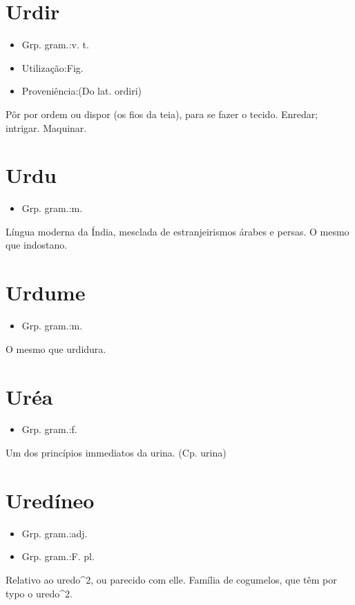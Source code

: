 \documentclass{article}
\begin{document}
\section{Urdir}
\begin{itemize}
\item {Grp. gram.:v. t.}
\end{itemize}
\begin{itemize}
\item {Utilização:Fig.}
\end{itemize}
\begin{itemize}
\item {Proveniência:(Do lat. \textunderscore ordiri\textunderscore )}
\end{itemize}
Pôr por ordem ou dispor (os fios da teia), para se fazer o tecido.
Enredar; intrigar.
Maquinar.
\section{Urdu}
\begin{itemize}
\item {Grp. gram.:m.}
\end{itemize}
Língua moderna da Índia, mesclada de estranjeirismos árabes e persas.
O mesmo que \textunderscore indostano\textunderscore .
\section{Urdume}
\begin{itemize}
\item {Grp. gram.:m.}
\end{itemize}
O mesmo que \textunderscore urdidura\textunderscore .
\section{Uréa}
\begin{itemize}
\item {Grp. gram.:f.}
\end{itemize}
Um dos princípios immediatos da urina.
(Cp. \textunderscore urina\textunderscore )
\section{Uredíneo}
\begin{itemize}
\item {Grp. gram.:adj.}
\end{itemize}
\begin{itemize}
\item {Grp. gram.:F. pl.}
\end{itemize}
Relativo ao uredo^2, ou parecido com elle.
Família de cogumelos, que têm por typo o uredo^2.
\end{document}
